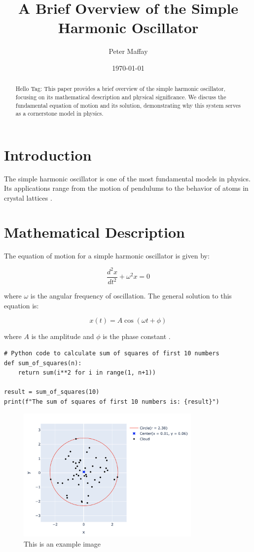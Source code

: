 \documentclass{article}  %
\title{A Brief Overview of the Simple Harmonic Oscillator}
\author{Peter Maffay}
\date{\today}
\begin{document}
\maketitle
\thispagestyle{fancy}

\begin{abstract}
    Hello Tag: 
This paper provides a brief overview of the simple harmonic oscillator,
focusing on its mathematical description and physical significance. We discuss
the fundamental equation of motion and its solution, demonstrating why this
system serves as a cornerstone model in physics.
\end{abstract}

\section{Introduction}
The simple harmonic oscillator is one of the most fundamental models in physics.
Its applications range from the motion of pendulums to the behavior of atoms
in crystal lattices \citep{feynman1963}.

\section{Mathematical Description}
The equation of motion for a simple harmonic oscillator is given by:

\begin{equation}
    \frac{d^2x}{dt^2} + \omega^2x = 0
\end{equation}

where $\omega$ is the angular frequency of oscillation. The general solution
to this equation is:

\begin{equation}
    x(t) = A\cos(\omega t + \phi)
\end{equation}

where $A$ is the amplitude and $\phi$ is the phase constant
\citep{goldstein2002}.

\begin{lstlisting}
# Python code to calculate sum of squares of first 10 numbers
def sum_of_squares(n):
    return sum(i**2 for i in range(1, n+1))

result = sum_of_squares(10)
print(f"The sum of squares of first 10 numbers is: {result}")
\end{lstlisting}

\begin{figure}[h]
    \centering
    \includegraphics[width=0.8\textwidth]{graph.png} %
    \caption{This is an example image}
    \label{fig:example}
\end{figure}



\end{document}
